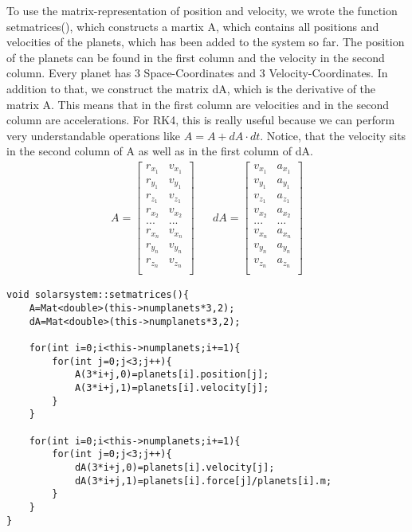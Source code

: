 \documentclass[10pt,a4paper]{article}
\begin{document}
To use the matrix-representation of position and velocity, we wrote the function setmatrices(), which constructs a martix A, which contains all positions and velocities of the planets, which has been added to the system so far. The position of the planets can be found in the first column and the velocity in the second column. Every planet has 3 Space-Coordinates and 3 Velocity-Coordinates. In addition to that, we construct the matrix dA, which is the derivative of the matrix A. This means that in the first column are velocities and in the second column are accelerations. For RK4, this is really useful because we can perform very understandable operations like $A=A+dA \cdot dt $.
Notice, that the velocity sits in the second column of A as well as in the first column of dA.
\begin{align}
A=
\begin{bmatrix}
r_{x_1} & v_{x_1}\\
r_{y_1} & v_{y_1} \\
r_{z_1} & v_{z_1} \\
r_{x_2} & v_{x_2} \\
... & ... \\
r_{x_n} & v_{x_n}\\
r_{y_n} & v_{y_n} \\
r_{z_n} & v_{z_n} \\
\end{bmatrix}
& &
dA=
\begin{bmatrix}
v_{x_1} & a_{x_1}\\
v_{y_1} & a_{y_1} \\
v_{z_1} & a_{z_1} \\
v_{x_2} & a_{x_2} \\
... & ... \\
v_{x_n} & a_{x_n}\\
v_{y_n} & a_{y_n} \\
v_{z_n} & a_{z_n} \\
\end{bmatrix}
\end{align}
\begin{lstlisting}
void solarsystem::setmatrices(){
    A=Mat<double>(this->numplanets*3,2);
    dA=Mat<double>(this->numplanets*3,2);
    
    for(int i=0;i<this->numplanets;i+=1){
        for(int j=0;j<3;j++){
            A(3*i+j,0)=planets[i].position[j];
            A(3*i+j,1)=planets[i].velocity[j];
        }
    }
    
    for(int i=0;i<this->numplanets;i+=1){
        for(int j=0;j<3;j++){
            dA(3*i+j,0)=planets[i].velocity[j];
            dA(3*i+j,1)=planets[i].force[j]/planets[i].m;
        }
    }
}
\end{lstlisting}
\end{document}
